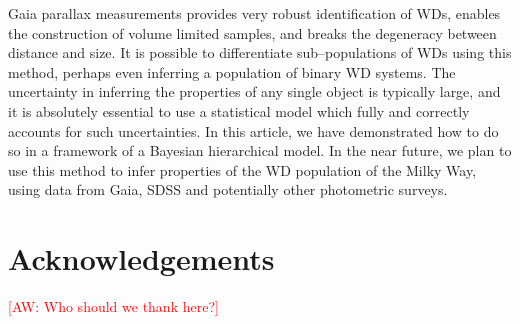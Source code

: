 \documentclass[fleqn,usenatbib]{mnras}
\newcommand{\aw}[1]{\textcolor{red}{[AW: #1]}}
\begin{document}
Gaia parallax measurements provides very robust identification of WDs, enables the construction of volume limited samples, and breaks the degeneracy between distance and size. It is possible to differentiate sub--populations of WDs using this method, perhaps even inferring a population of binary WD systems. The uncertainty in inferring the properties of any single object is typically large, and it is absolutely essential to use a statistical model which fully and correctly accounts for such uncertainties. In this article, we have demonstrated how to do so in a framework of a Bayesian hierarchical model. In the near future, we plan to use this method to infer properties of the WD population of the Milky Way, using data from Gaia, SDSS and potentially other photometric surveys.



\section*{Acknowledgements}

\aw{Who should we thank here?}












\bsp	%
\label{lastpage}
\end{document}
